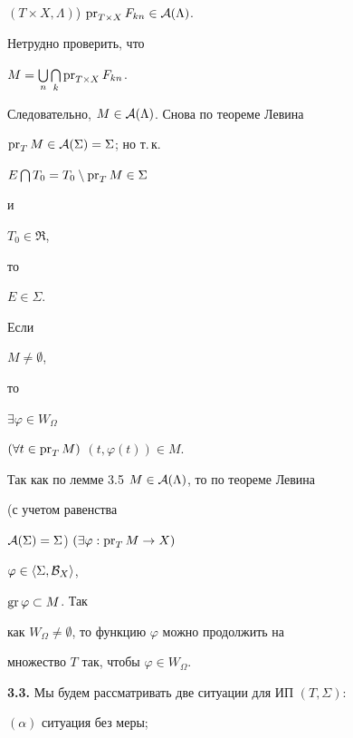 \begin{pf}
$(T\times X,\Lambda)$) $\operatorname{pr}_{T\times X}F_{kn}\in{\cal A}(\Lambda)$.


Нетрудно проверить, что


$M=\bigcup\limits_n\bigcap\limits_k\operatorname{pr}_{T\times X}F_{kn}$.


Следовательно, $M\in{\cal A}(\Lambda)$. Снова по теореме Левина


$\operatorname{pr}_T M\in{\cal A}(\Sigma)=\Sigma$; но т.\,к.


$E\bigcap T_0=T_0\setminus\operatorname{pr}_TM\in\Sigma$


и


$T_0\in\Re$,


то


$E\in\Sigma$.


\end{pf}





\begin{cors} Если


$M\ne\emptyset$,


то


$\exists\varphi\in W_\Omega$ \;


$(\forall t\in\operatorname{pr}_TM)$ \; $(t,\varphi(t))\in M$.


\end{cors}





\begin{pf} Так как по лемме 3.5 $M\in{\cal A}(\Lambda)$, то по теореме Левина


(с учетом равенства


${\cal A}(\Sigma)=\Sigma$) $(\exists\varphi:\operatorname{pr}_T M\to X)$ \;


$\varphi\in\langle \Sigma,{\cal B}_X\rangle $,


$\operatorname{gr}\varphi\subset M$. Так


как $W_\Omega\ne\emptyset$, то функцию $\varphi$ можно продолжить на


множество $T$ так, чтобы $\varphi\in W_\Omega$.


\end{pf}





{\bf 3.3.} Мы будем рассматривать две ситуации для ИП $(T,\Sigma)$:





$(\alpha)$ ситуация без меры;





